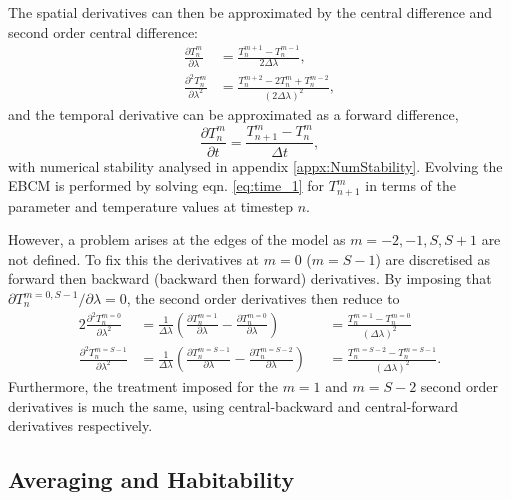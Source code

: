 \documentclass[12pt, onecolumn]{revtex4-2}    %
\newcommand{\partialderiv}[2]{\frac{\partial {#1}}{\partial {#2}}}
\newcommand{\partialderivsecnd}[2]{\frac{\partial^2 {#1}}{\partial {#2}^2}}
\begin{document}
The spatial derivatives can then be approximated by the central difference and second order central difference:
\begin{align}
  \partialderiv{T^m_n}{\lambda}      & = \frac{T^{m+1}_n - T^{m-1}_n}{2 \Delta\lambda},             \label{eq:space_1} \\
  \partialderivsecnd{T^m_n}{\lambda} & = \frac{T^{m+2}_n -2T^m_n + T^{m-2}_n}{(2 \Delta\lambda)^2}, \label{eq:space_2}
\end{align} 
and the temporal derivative can be approximated as a forward difference,
\begin{equation}
  \partialderiv{T^m_n}{t} = \frac{T^m_{n+1} - T^m_n}{\Delta t},
  \label{eq:time_1}
\end{equation}
with numerical stability analysed in appendix \ref{appx:NumStability}.
Evolving the EBCM is performed by solving eqn. \eqref{eq:time_1} for $T^m_{n+1}$ in terms of the parameter and temperature values at timestep $n$.

However, a problem arises at the edges of the model as $m=-2, -1, S, S+1$ are not defined.
To fix this the derivatives at $m=0$ ($m=S-1$) are discretised as forward then backward (backward then forward) derivatives.
By imposing that ${\partial T^{m=0, S-1}_n}/{\partial \lambda} = 0$, the second order derivatives then reduce to
\begin{alignat}{2}
  \partialderivsecnd{T^{m=0}_n}{\lambda}   & = \frac{1}{\Delta\lambda  }\left(\partialderiv{T^{m=1}_n}{\lambda} - \partialderiv{T^{m=0}_n}{\lambda}\right)    &  & = \frac{T^{m=1}_n - T^{m=0}_n}{(\Delta\lambda)^2}
  \label{eq:forward_backward}                                                                                                                                                                                     \\
  \partialderivsecnd{T^{m=S-1}_n}{\lambda} & = \frac{1}{\Delta\lambda  }\left(\partialderiv{T^{m=S-1}_n}{\lambda} - \partialderiv{T^{m=S-2}_n}{\lambda}\right) &  & = \frac{T^{m=S-2}_n - T^{m=S-1}_n}{(\Delta\lambda)^2}.
  \label{eq:backward_forward}
\end{alignat}
Furthermore, the treatment imposed for the $m=1$ and $m=S-2$ second order derivatives is much the same, using central-backward and central-forward derivatives respectively.

\subsection{Averaging and Habitability} \label{ssec:habiAver}
\end{document}
